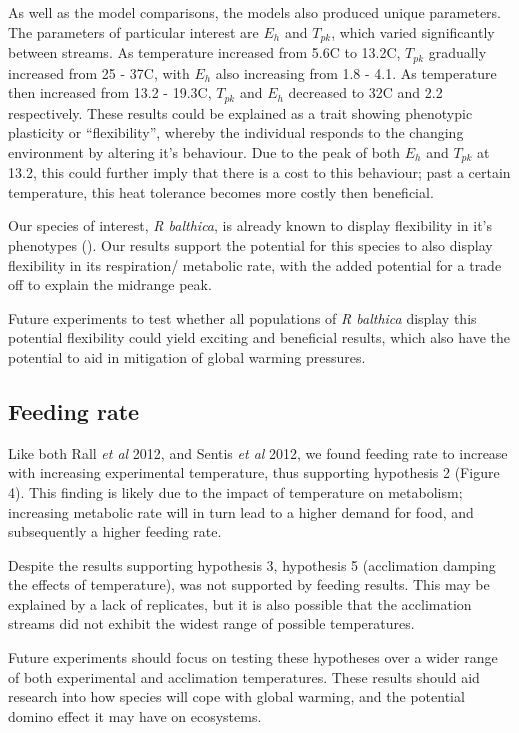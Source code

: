 \documentclass[../../Paper.tex]{subfiles}
\begin{document}
As well as the model comparisons, the models also produced unique parameters. The parameters of particular
interest are $E_h$ and $T_{pk}$, which varied significantly between streams. As temperature increased
from 5.6\degree C to 13.2\degree C, $T_{pk}$ gradually increased from 25 - 37\degree C, with $E_h$ also increasing
from 1.8 - 4.1. As temperature then increased from 13.2 - 19.3\degree C, $T_{pk}$ and $E_h$ decreased to 32\degree C
and 2.2 respectively. These results could be explained as a trait showing phenotypic plasticity or ``flexibility'',
whereby the individual responds to the changing environment by altering it's behaviour. Due to the peak of both $E_h$
and $T_{pk}$ at 13.2, this could further imply that there is a cost to this behaviour; past a certain 
temperature, this heat tolerance becomes more costly then beneficial.

Our species of interest, \textit{R balthica}, is already known to display flexibility in it's 
phenotypes (\cite{ahlgren_camouflaged_2013}). Our results support the potential for this species
to also display flexibility in its respiration/ metabolic rate, with the added potential for a trade 
off to explain the midrange peak. 

Future experiments to test whether all populations of \textit{R balthica} display this potential flexibility
could yield exciting and beneficial results, which also have the potential to aid in mitigation of global warming
pressures. 

\subsection*{Feeding rate}

Like both Rall \textit{et al} 2012, and Sentis \textit{et al} 2012, we found feeding rate to increase with
increasing experimental temperature, thus supporting hypothesis 2 (Figure 4). This finding is likely due to the
impact of temperature on metabolism; increasing metabolic rate will in turn lead to a higher demand for food, and 
subsequently a higher feeding rate. 

Despite the results supporting hypothesis 3, hypothesis 5 (acclimation damping the effects of temperature), was not 
supported by feeding results. This may be explained by a lack of replicates, but it is also possible that the
acclimation streams did not exhibit the widest range of possible temperatures. 

Future experiments should focus on testing these hypotheses over a wider range of both experimental and acclimation 
temperatures. These results should aid research into how species will cope with global warming, and the 
potential domino effect it may have on ecosystems. 
\end{document}
